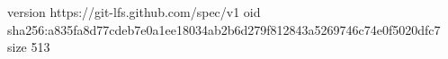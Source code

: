 version https://git-lfs.github.com/spec/v1
oid sha256:a835fa8d77cdeb7e0a1ee18034ab2b6d279f812843a5269746c74e0f5020dfc7
size 513
